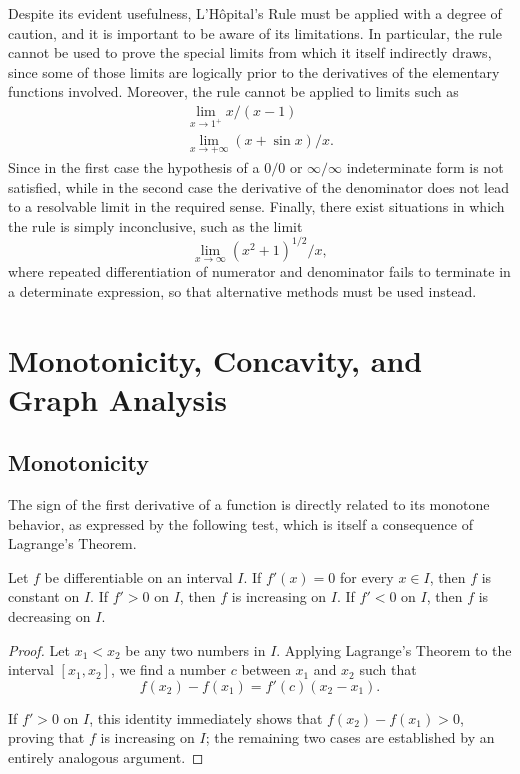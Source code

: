 Despite its evident usefulness, L'H\^opital's Rule must be applied with a degree of caution, and it is important to be aware of its limitations. In particular, the rule cannot be used to prove the special limits from which it itself indirectly draws, since some of those limits are logically prior to the derivatives of the elementary functions involved. Moreover, the rule cannot be applied to limits such as
\[
\begin{gathered}
\lim_{x \to 1^+} x/(x-1) \\
\lim_{x \to +\infty} (x + \sin x)/x.
\end{gathered}
\]
Since in the first case the hypothesis of a $0/0$ or $\infty/\infty$ indeterminate form is not satisfied, while in the second case the derivative of the denominator does not lead to a resolvable limit in the required sense. Finally, there exist situations in which the rule is simply inconclusive, such as the limit
\[
\lim_{x \to \infty} (x^2+1)^{1/2}/x,
\]
where repeated differentiation of numerator and denominator fails to terminate in a determinate expression, so that alternative methods must be used instead.

\section{Monotonicity, Concavity, and Graph Analysis}

\subsection{Monotonicity}

The sign of the first derivative of a function is directly related to its monotone behavior, as expressed by the following test, which is itself a consequence of Lagrange's Theorem.

\begin{theorem}
Let $f$ be differentiable on an interval $I$. If $f'(x) = 0$ for every $x \in I$, then $f$ is constant on $I$. If $f' > 0$ on $I$, then $f$ is increasing on $I$. If $f' < 0$ on $I$, then $f$ is decreasing on $I$.
\end{theorem}

\begin{proof}
Let $x_1 < x_2$ be any two numbers in $I$. Applying Lagrange's Theorem to the interval $[x_1, x_2]$, we find a number $c$ between $x_1$ and $x_2$ such that
\[
f(x_2) - f(x_1) = f'(c)(x_2 - x_1).
\]

If $f' > 0$ on $I$, this identity immediately shows that $f(x_2) - f(x_1) > 0$, proving that $f$ is increasing on $I$; the remaining two cases are established by an entirely analogous argument.
\end{proof}

